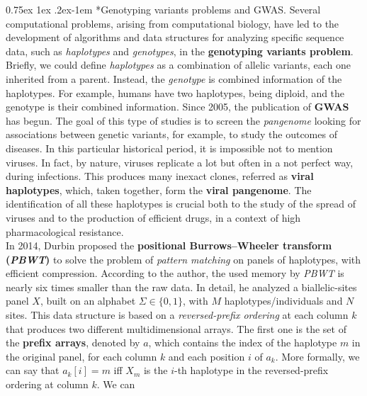 \documentclass[a4paper,11pt, oneside]{article}
\makeatletter
\renewcommand{\paragraph}{%
  \@startsection{paragraph}{4}%
  {\z@}{0.75ex \@plus 1ex \@minus .2ex}{-1em}%
  {\normalfont\normalsize\bfseries}%
}
\makeatother
\begin{document}
\paragraph*{Genotyping variants problems and GWAS.}
Several computational problems, arising from computational
biology, have led to the development of algorithms and data
structures for analyzing specific sequence data, such as \textit{haplotypes} and
\textit{genotypes}, in the \textbf{genotyping variants problem}. Briefly, we
could define \textit{haplotypes} as a combination of allelic variants, each one
inherited from a parent. Instead, the \textit{genotype} is combined information
of the haplotypes. For example, humans have two haplotypes, being diploid, and
the genotype is their combined information. Since 2005, the publication of
\textbf{GWAS} has begun. The goal of this type of studies is to screen the
\textit{pangenome} looking for associations between genetic variants, for
example, to study the outcomes of diseases. In this particular historical
period, it is impossible not to mention viruses. In fact, by nature, viruses
replicate a lot but often in a not perfect way, during infections. This produces
many inexact clones, referred as \textbf{viral haplotypes}, which, taken
together, form the \textbf{viral pangenome}. The identification of all these
haplotypes is crucial both to the study of the spread of viruses and to the
production of efficient drugs, in a context of high pharmacological
resistance.\\
In 2014, Durbin proposed the
\textbf{positional Burrows–Wheeler transform (\textit{PBWT})} to
solve the problem of \textit{pattern matching} on panels of haplotypes,
with efficient compression. According to the author, the used
memory by \textit{PBWT} is nearly six times smaller than the raw data.
In detail, he analyzed a biallelic-sites panel $X$, built on an
alphabet $\Sigma\in\{0,1\}$, with $M$ haplotypes/individuals and $N$ sites. This
data structure is based on a \textit{reversed-prefix ordering} at 
each column $k$ that produces two different multidimensional arrays. The first
one is the set of the \textbf{prefix arrays}, denoted by $a$, which contains the
index of the haplotype $m$ in the original panel, for each column $k$ and
each position $i$ of $a_k$. More formally, we can say that $a_k[i]=m$ iff $X_m$
is the $i$-th haplotype in the reversed-prefix ordering at column $k$. We can
\end{document}
